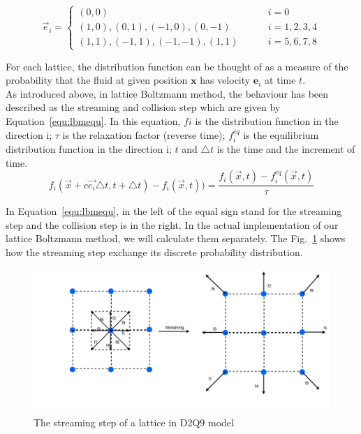 \begin{equation}
\label{equ:d2q9}
    \vec{e}_{i} = \left\{\begin{matrix}
(0,0) \qquad\qquad\qquad\qquad\qquad\qquad &i=0 \\ 
(1,0), (0,1), (-1,0), (0,-1)\quad\qquad &i=1,2,3,4 \\ 
(1,1), (-1,1), (-1,-1), (1,1)\qquad & i=5,6,7,8
\end{matrix}\right.
\end{equation}

For each lattice, the distribution function can be thought of as a measure of the probability that the fluid at given position $\mathbf{x}$ has velocity $\mathbf{e}_i$ at time $t$.\\

As introduced above, in lattice Boltzmann method, the behaviour has been described as the streaming and collision step which are given by Equation~\ref{equ:lbmequ}. In this equation, $fi$ is the distribution function in the direction i; $\tau$ is the relaxation factor (reverse time); $f_i^{eq}$ is the equilibrium distribution function in the direction i; $t$ and $\triangle t$ is the time and the increment of time.\\

\begin{equation}
\label{equ:lbmequ}
f_i(\vec{x}+c\vec{e_i}\triangle t, t+\triangle t) - f_i(\vec x,t)) = \frac{f_i(\vec x, t) - f_i^{eq}(\vec x , t)}{\tau}
\end{equation}




In Equation~\ref{equ:lbmequ}, in the left of the equal sign stand for the streaming step and the collision step is in the right. In the actual implementation of our lattice Boltzmann method, we will calculate them separately. The Fig.~\ref{fig:stream} shows how the streaming step exchange its discrete probability distribution.\\


\begin{figure}[!tb]
   \centering
       \includegraphics[width=1\textwidth]{figures/stream.jpg}
       \caption{The streaming step of a lattice in D2Q9 model}
       \label{fig:stream}
\end{figure}

